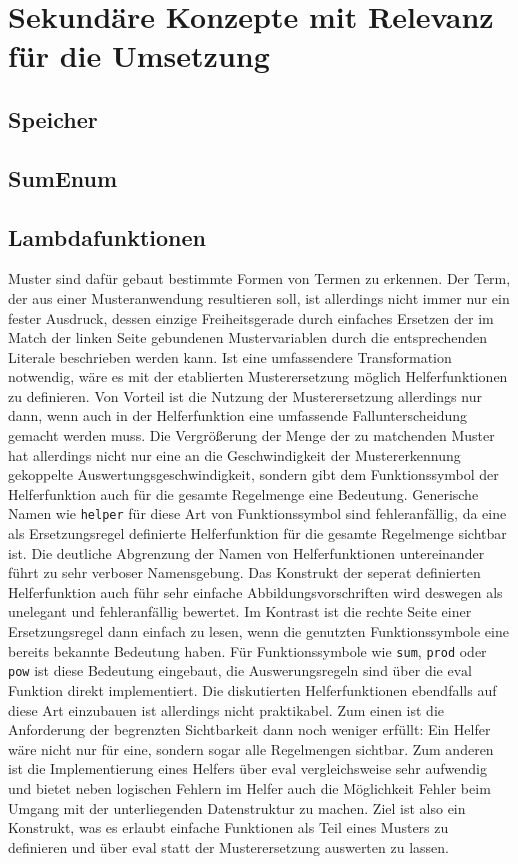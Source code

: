 \documentclass{scrartcl}
\numberwithin{figure}{section} %
\theoremstyle{definition} %
\begin{document}
\section{Sekundäre Konzepte mit Relevanz für die Umsetzung} \label{secHilfUmsetzungInCpp}

\subsection{Speicher} \label{subsecCppSpeicher}

\subsection{SumEnum} \label{subsecCppSumEnum}

\subsection{Lambdafunktionen} \label{subsecLambdafunktionen}
Muster sind dafür gebaut bestimmte Formen von Termen zu erkennen. Der Term, der aus einer Musteranwendung resultieren soll, ist allerdings nicht immer nur ein fester Ausdruck, dessen einzige Freiheitsgerade durch einfaches Ersetzen der im Match der linken Seite gebundenen Mustervariablen durch die entsprechenden Literale beschrieben werden kann. Ist eine umfassendere Transformation notwendig, wäre es mit der etablierten Musterersetzung möglich Helferfunktionen zu definieren. Von Vorteil ist die Nutzung der Musterersetzung allerdings nur dann, wenn auch in der Helferfunktion eine umfassende Fallunterscheidung gemacht werden muss. Die Vergrößerung der Menge der zu matchenden Muster hat allerdings nicht nur eine an die Geschwindigkeit der Mustererkennung gekoppelte Auswertungsgeschwindigkeit,  sondern gibt dem Funktionssymbol der Helferfunktion auch für die gesamte Regelmenge eine Bedeutung. 
Generische Namen wie \texttt{helper} für diese Art von Funktionssymbol sind fehleranfällig, da eine als Ersetzungsregel definierte Helferfunktion für die gesamte Regelmenge sichtbar ist. Die deutliche Abgrenzung der Namen von Helferfunktionen untereinander führt zu sehr verboser Namensgebung.
Das Konstrukt der seperat definierten Helferfunktion auch führ sehr einfache Abbildungsvorschriften wird deswegen als unelegant und fehleranfällig bewertet. 
Im Kontrast ist die rechte Seite einer Ersetzungsregel dann einfach zu lesen, wenn die genutzten Funktionssymbole eine bereits bekannte Bedeutung haben. Für Funktionssymbole wie \texttt{sum}, \texttt{prod} oder \texttt{pow} ist diese Bedeutung eingebaut, die Auswerungsregeln sind über die $\mathrm{eval}$ Funktion direkt implementiert. Die diskutierten Helferfunktionen ebendfalls auf diese Art einzubauen ist allerdings nicht praktikabel. Zum einen ist die Anforderung der begrenzten Sichtbarkeit dann noch weniger erfüllt: Ein Helfer wäre nicht nur für eine, sondern sogar alle Regelmengen sichtbar. Zum anderen ist die Implementierung eines Helfers über $\mathrm{eval}$ vergleichsweise sehr aufwendig und bietet neben logischen Fehlern im Helfer auch die Möglichkeit Fehler beim Umgang mit der unterliegenden Datenstruktur zu machen. Ziel ist also ein Konstrukt, was es erlaubt einfache Funktionen als Teil eines Musters zu definieren und über $\mathrm{eval}$ statt der Musterersetzung auswerten zu lassen. 
\end{document}
